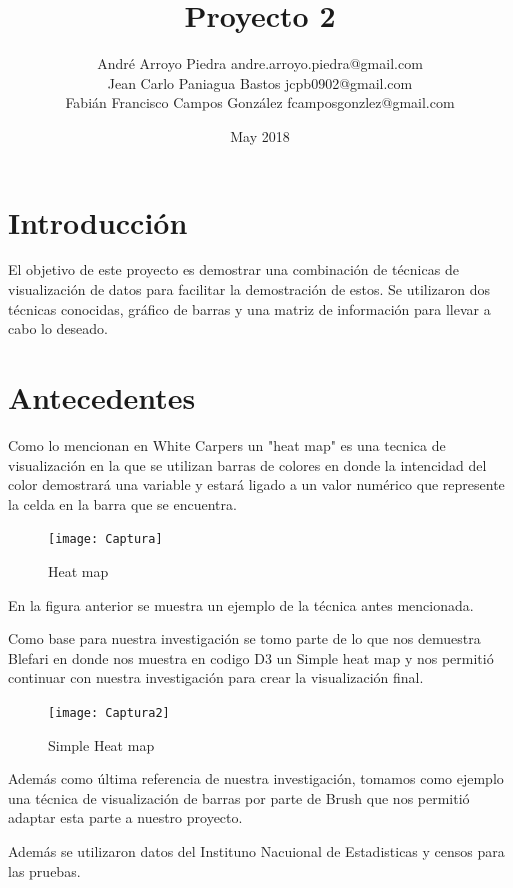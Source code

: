 \documentclass{article}
\title{Proyecto 2}
\author{André Arroyo Piedra andre.arroyo.piedra@gmail.com \\
Jean Carlo Paniagua Bastos jcpb0902@gmail.com \\
Fabián Francisco Campos González fcamposgonzlez@gmail.com}
\date{May 2018}
\begin{document}
\maketitle

\section{Introducción}
El objetivo de este proyecto es demostrar una combinación de técnicas de visualización de datos para facilitar la demostración de estos. Se utilizaron dos técnicas conocidas, gráfico de barras y una matriz de información para llevar a cabo lo deseado.

\section{Antecedentes}
Como lo mencionan en White Carpers
 \citep{WiteCarpers}
 un "heat map" es una tecnica de visualización en la que se utilizan barras de colores en donde la intencidad del color demostrará una variable y estará ligado a un valor numérico que represente la celda en la barra que se encuentra. 
 
 \begin{figure}[h!]
\centering
\texttt{[image: Captura]}
\caption{Heat map}
\label{fig:Captura}
\end{figure}

En la figura anterior se muestra un ejemplo de la técnica antes mencionada.\newline

Como base para nuestra investigación se tomo parte de lo que nos demuestra Blefari 
 \citep{Blefari} en donde nos muestra en codigo D3 un Simple heat map y nos permitió continuar con nuestra investigación para crear la visualización final.  
 
  \begin{figure}[h!]
\raggedright
\texttt{[image: Captura2]}
\caption{Simple Heat map}
\label{fig:Captura 1}
\end{figure}

Además como última referencia de nuestra investigación, tomamos como ejemplo una técnica de visualización de barras por parte de Brush
\citep{Brush}
que nos permitió adaptar esta parte a nuestro proyecto.\newline

Además se utilizaron datos del Instituno Nacuional de Estadisticas y censos para las pruebas. 
\citep{INECNacimientos} 
\citep{INECAgropecuario}
\citep{INECMatrimonios}
\end{document}
